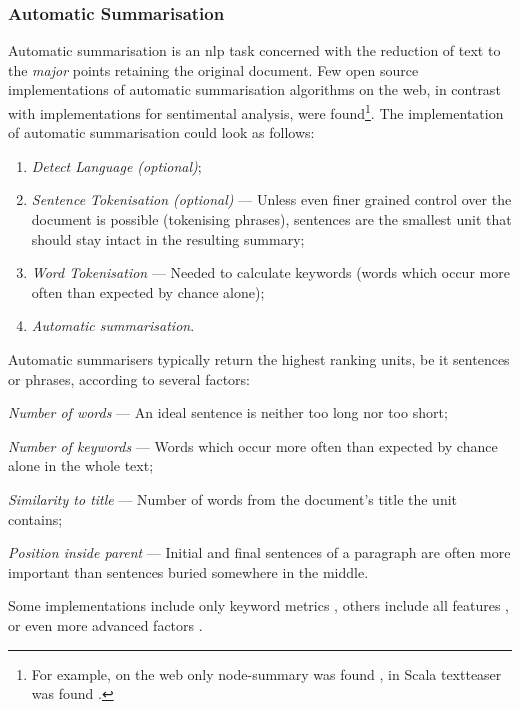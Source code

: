 \subsubsection{Automatic Summarisation}\label{automatic-summarisation}

Automatic summarisation is an \gls{nlp} task concerned with the reduction
  of text to the \emph{major} points retaining the original document.
Few open source implementations of automatic summarisation algorithms on
  the web, in contrast with implementations for sentimental analysis, were
  found\footnote{For example, on the web only node-summary was found
    \autocite{jbrooksuk/node-summary-source-code}, in Scala textteaser was
    found \autocite{MojoJolo/textteaser-source-code}.}.
The implementation of automatic summarisation could look as follows:

\begin{enumerate}
\item\emph{Detect Language (optional)};
\item\emph{Sentence Tokenisation (optional)} --- Unless even finer grained
  control over the document is possible (tokenising phrases), sentences are
  the smallest unit that should stay intact in the resulting summary;
\item\emph{Word Tokenisation} --- Needed to calculate keywords (words
  which occur more often than expected by chance alone);
\item\emph{Automatic summarisation}.
\end{enumerate}

Automatic summarisers typically return the highest ranking units, be it
  sentences or phrases, according to several factors:

\begin{aenumerate}
\item\emph{Number of words} --- An ideal sentence is neither too long nor
  too short;
\item\emph{Number of keywords} --- Words which occur more often than
  expected by chance alone in the whole text;
\item\emph{Similarity to title} --- Number of words from the document's
  title the unit contains;
\item\emph{Position inside parent} --- Initial and final sentences of a
  paragraph are often more important than sentences buried somewhere in
  the middle.
\end{aenumerate}

Some implementations include only keyword metrics
  \autocite{jbrooksuk/node-summary-source-code}, others include all features
  \autocite{MojoJolo/textteaser-source-code}, or even more advanced factors
  \autocite{summly}.

